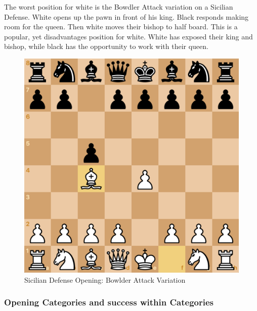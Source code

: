 \documentclass[reprint,
 amsmath,amssymb,nobibnotes,
 aps, floatfix]{revtex4-1}
\begin{document}
The worst position for white is the Bowdler Attack variation on a Sicilian Defense. White opens up the pawn in front of his king. Black responds making room for the queen. Then white moves their bishop to half board. This is a popular, yet disadvantages position for white. White has exposed their king and bishop, while black has the opportunity to work with their queen.

\begin{figure}[H]
    \centering
    \includegraphics[scale=.2]{bowlderattack.png}
    \caption{Sicilian Defense Opening: Bowlder Attack Variation}
    \label{fig:Bowlder}
\end{figure}
\subsubsection{Opening Categories and success within Categories }
\end{document}
